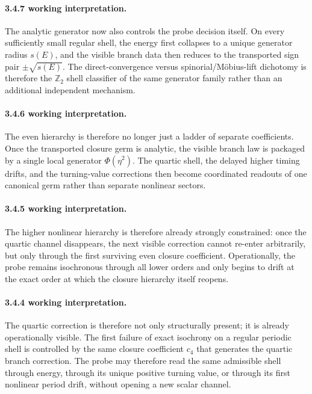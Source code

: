 \documentclass[12pt,a4paper]{article}
\begin{document}
\paragraph{3.4.7 working interpretation.}
The analytic generator now also controls the probe decision itself. On every sufficiently small regular shell, the energy first collapses to a unique generator radius $s(E)$, and the visible branch data then reduces to the transported sign pair $\pm\sqrt{s(E)}$. The direct-convergence versus spinorial/M\"obius-lift dichotomy is therefore the $\mathbb Z_2$ shell classifier of the same generator family rather than an additional independent mechanism.

\paragraph{3.4.6 working interpretation.}
The even hierarchy is therefore no longer just a ladder of separate coefficients. Once the transported closure germ is analytic, the visible branch law is packaged by a single local generator $\Phi(\eta^2)$. The quartic shell, the delayed higher timing drifts, and the turning-value corrections then become coordinated readouts of one canonical germ rather than separate nonlinear sectors.

\paragraph{3.4.5 working interpretation.}
The higher nonlinear hierarchy is therefore already strongly constrained: once the quartic channel disappears, the next visible correction cannot re-enter arbitrarily, but only through the first surviving even closure coefficient. Operationally, the probe remains isochronous through all lower orders and only begins to drift at the exact order at which the closure hierarchy itself reopens.

\paragraph{3.4.4 working interpretation.}
The quartic correction is therefore not only structurally present; it is already operationally visible. The first failure of exact isochrony on a regular periodic shell is controlled by the same closure coefficient $c_4$ that generates the quartic branch correction. The probe may therefore read the same admissible shell through energy, through its unique positive turning value, or through its first nonlinear period drift, without opening a new scalar channel.
\end{document}
